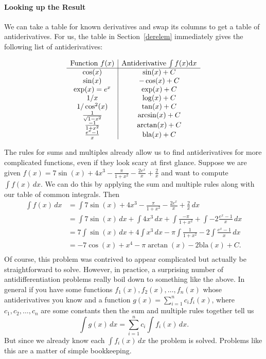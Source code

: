 \paragraph{Looking up the Result}

We can take a table for known derivatives and swap its columns to get a
table of antiderivatives.
For us, the table in Section~\ref{derelem} immediately gives the following
list of antiderivatives:

\[
\begin{array}{c|c}
\mbox{Function $f(x)$}&\mbox{Antiderivative $\int f(x){\mbox{d}}x$}\\
\hline
\cos(x)&\sin(x)+C\\
\sin(x)&-\cos(x)+C\\
\exp(x)=e^x&\exp(x)+C\\
1/x&\log(x)+C\\
1/\cos^2(x)&\tan(x)+C\\
\frac{1}{\sqrt{1-x^2}}&
\arcsin(x)+C\\
\frac{-1}{1+x^2}&
\arctan(x)+C\\
\frac{e^x-1}{x}&
\mbox{bla}(x)+C\\
\end{array}
\]

\begin{bsp}
The rules for sums  and multiples already allow us to find antiderivatives
for more complicated functions, even if they look scary at first glance.
Suppose we are given $f(x) = 7\sin(x) + 4x^3 - \frac{\pi}{1+x^2} - \frac{2e^x}{x}+\frac{2}{x}$ and want to compute $\int f(x) \, dx$. We can do this by applying the sum and multiple rules along with our table of common integrals. Then
\begin{equation*}
\begin{split}
\int f(x) \, dx &=  \int 7\sin(x) + 4x^3 - \frac{\pi}{1+x^2} - \frac{2e^x}{x}+\frac{2}{x} \, dx\\
&= \int 7\sin(x) \, dx + \int 4x^3 \, dx + \int \frac{-\pi}{1+x^2} + \int -2\frac{e^x-1}{x} \, dx\\
&=  7\int \sin(x) \, dx + 4\int x^3 \, dx - \pi\int \frac{1}{1+x^2} - 2\int \frac{e^x-1}{x} \, dx \\
&= -7\cos(x) + x^4 -\pi\arctan(x) - 2\text{bla}(x) + C. \\
\end{split}
\end{equation*}
Of course, this problem was contrived to appear complicated but actually be straightforward to solve. However, in practice, a surprising number of antidifferentiation problems really boil down to something like the above. In general if you have some functions $f_1(x),f_2(x), \dots, f_n(x)$ whose antiderivatives you know and a function $g(x) = \sum_{i=1}^{n}c_if_i(x)$, where $c_1,c_2,\dots,c_n$ are some constants then the sum and multiple rules together tell us
\[\int g(x) \, dx = \sum_{i=1}^{n}c_i\int f_i(x) \, dx.\]
But since we already know each $\int f_i(x) \, dx$ the problem is solved. Problems like this are a matter of simple bookkeeping. 
\end{bsp}

